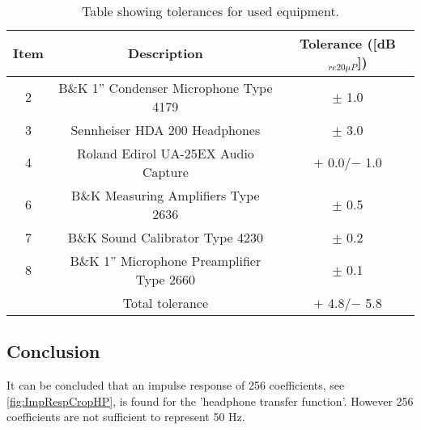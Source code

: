 \begin{table}[H]
	\centering
	\begin{tabular}{ c c c } \toprule
	{Item}	& 		{Description} 							& {Tolerance ([dB$_{re20\mu P}$])}\\ \bottomrule 
		2	&	B\&K 1'' Condenser Microphone Type 4179 	& $\pm$ 1.0 	\cite{BK4179_2660Tol}		\\
		3	&	Sennheiser HDA 200 Headphones				& $\pm$ 3.0	\cite{HDA200Tol}	\\
		4	&	Roland Edirol UA-25EX Audio Capture			& $+$ 0.0/$-$ 1.0	\cite{UA25EXTol}	\\
		6	&	B\&K Measuring Amplifiers Type 2636			& $\pm$ 0.5	\cite{BK2636Tol}	\\
		7	&	B\&K Sound Calibrator Type 4230				& $\pm$ 0.2	\cite{BK4231Tol}	\\ 
		8	&	B\&K 1'' Microphone Preamplifier Type 2660	& $\pm$ 0.1	\cite{UA25EXTol}	\\ \bottomrule
			&	Total tolerance								& $+$ 4.8/$-$ 5.8		\\ \bottomrule	
	\end{tabular}
	\caption{Table showing tolerances for used equipment.}
	\label{TolerancesHP}
\end{table}

\subsection{Conclusion}
It can be concluded that an impulse response of 256 coefficients, see \autoref{fig:ImpRespCropHP}, is found for the 'headphone transfer function'. However 256 coefficients are not sufficient to represent 50 Hz.    
